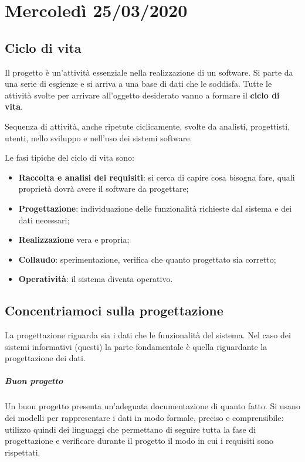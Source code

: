 \chapter{Mercoledì 25/03/2020}
\section{Ciclo di vita}
Il progetto è un'attività essenziale nella realizzazione di un software. Si parte da una serie di esgienze e si arriva a una base di dati che le soddisfa. Tutte le attività svolte per arrivare all'oggetto desiderato vanno a formare il \textbf{ciclo di vita}.
\begin{definizione}
	Sequenza di attività, anche ripetute ciclicamente, svolte da analisti, progettisti, utenti, nello sviluppo e nell'uso dei sistemi software.
\end{definizione}
\noindent Le fasi tipiche del ciclo di vita sono:
\begin{itemize}
	\item \textbf{Raccolta e analisi dei requisiti}: si cerca di capire cosa bisogna fare, quali proprietà dovrà avere il software da progettare;
	\item \textbf{Progettazione}: individuazione delle funzionalità richieste dal sistema e dei dati necessari;
	\item \textbf{Realizzazione} vera e propria;
	\item \textbf{Collaudo}: sperimentazione, verifica che quanto progettato sia corretto;
	\item \textbf{Operatività}: il sistema diventa operativo.
\end{itemize}
\section{Concentriamoci sulla progettazione}
La progettazione riguarda sia i dati che le funzionalità del sistema. Nel caso dei sistemi informativi (questi) la parte fondamentale è quella riguardante la progettazione dei dati.
\paragraph{Buon progetto} Un buon progetto presenta un'adeguata documentazione di quanto fatto. Si usano dei modelli per rappresentare i dati in modo formale, preciso e comprensibile: utilizzo quindi dei linguaggi che permettano di seguire tutta la fase di progettazione e verificare durante il progetto il modo in cui i requisiti sono rispettati.
